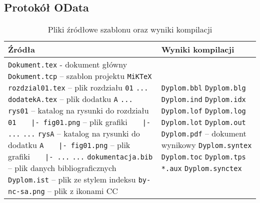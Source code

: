\subsection{Protokół OData}
\label{sec:odata}

\begin{table}[htb]
\centering\small
\caption{Pliki źródłowe szablonu oraz wyniki kompilacji}
\label{tab:szablon}
\begin{tabularx}{\linewidth}{|p{.55\linewidth}|X|}\hline
Źródła & Wyniki kompilacji \\ \hline\hline
\verb?Dokument.tex? - dokument główny\newline
\verb?Dokument.tcp? -- szablon projektu \texttt{MiKTeX}\newline
\verb?rozdzial01.tex? -- plik rozdziału \texttt{01}\newline
\verb?...?\newline
\verb?dodatekA.tex? -- plik dodatku \texttt{A}\newline
\verb?...?\newline
\verb?rys01? -- katalog na rysunki do rozdziału \texttt{01}\newline
\verb?   |- fig01.png? -- plik grafiki\newline
\verb?   |- ...?\newline
\verb?...?\newline
\verb?rysA? -- katalog na rysunki do dodatku \texttt{A}\newline
\verb?   |- fig01.png? -- plik grafiki\newline
\verb?   |- ...?\newline
\verb?...?\newline
\verb?dokumentacja.bib? -- plik danych bibliograficznych\newline
\verb?Dyplom.ist? -- plik ze stylem indeksu\newline
\verb?by-nc-sa.png? -- plik z ikonami CC\newline
 &
\verb?Dyplom.bbl?\newline
\verb?Dyplom.blg?\newline
\verb?Dyplom.ind?\newline
\verb?Dyplom.idx?\newline
\verb?Dyplom.lof?\newline
\verb?Dyplom.log?\newline
\verb?Dyplom.lot?\newline
\verb?Dyplom.out?\newline
\verb?Dyplom.pdf? -- dokument wynikowy\newline
\verb?Dyplom.syntex?\newline
\verb?Dyplom.toc?\newline
\verb?Dyplom.tps?\newline
\verb?*.aux?\newline 
\verb?Dyplom.synctex?\newline\\
\hline
\end{tabularx}
\end{table}

